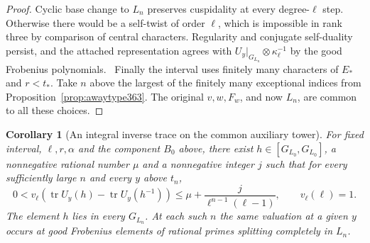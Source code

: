 \documentclass[a4paper,11pt]{article}
\newtheorem{corollary}[proposition]{Corollary}
\theoremstyle{definition}
\theoremstyle{remark}
\numberwithin{equation}{section}
\begin{document}
\begin{proof}
Cyclic base change to \(L_n\) preserves cuspidality at every
degree-\(\ell\) step. Otherwise there would be a self-twist
of order \(\ell\), which is impossible in rank three by
comparison of central characters. Regularity and conjugate
self-duality persist, and the attached representation agrees
with \(U_y|_{G_{L_n}}\otimes\kappa_\ell^{-1}\) by the good
Frobenius polynomials.~\cite{VII-V-I-ac123,VII-V-V-shin}
Finally the interval uses finitely many characters of \(E_*\)
and \(r<t_*\). Take \(n\) above the largest of the finitely
many exceptional indices from Proposition~\ref{prop:awaytype363}.
The original \(v,w,F_w\), and now \(L_n\), are common to all
these choices.
\end{proof}

\begin{corollary}[An integral inverse trace on the common auxiliary tower]
\label{cor:skewsize363}
For fixed interval, \(\ell,r,\alpha\) and the component \(B_0\)
above, there exist
\(h\in[G_{L_0},G_{L_0}]\), a nonnegative rational number \(\mu\)
and a nonnegative integer \(j\) such that for every sufficiently
large \(n\) and every \(y\) above \(t_n\),
\[
  0<v_\ell\!\left(\operatorname{tr}U_y(h)-
                   \operatorname{tr}U_y(h^{-1})\right)
     \le \mu+\frac{j}{\ell^{n-1}(\ell-1)} ,
                  \qquad v_\ell(\ell)=1 .
\]
The element \(h\) lies in every \(G_{L_n}\). At each such \(n\)
the same valuation at a given \(y\) occurs at good Frobenius
elements of rational primes splitting completely in \(L_n\).
\end{corollary}
\end{document}
